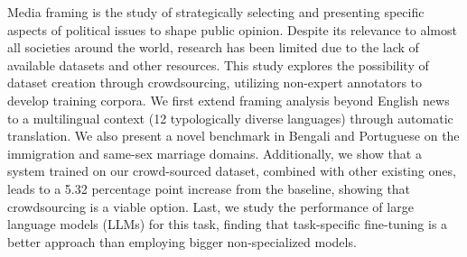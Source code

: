 Media framing is the study of strategically selecting and presenting specific aspects of political issues to shape public opinion. Despite its relevance to almost all societies around the world, research has been limited due to the lack of available datasets and other resources. This study explores the possibility of dataset creation through crowdsourcing, utilizing non-expert annotators to develop training corpora. We first extend framing analysis beyond English news to a multilingual context (12 typologically diverse languages) through automatic translation. We also present a novel benchmark in Bengali and Portuguese on the immigration and same-sex marriage domains. Additionally, we show that a system trained on our crowd-sourced dataset, combined with other existing ones, leads to a 5.32 percentage point increase from the baseline, showing that crowdsourcing is a viable option. Last, we study the performance of large language models (LLMs) for this task, finding that task-specific fine-tuning is a better approach than employing bigger non-specialized models.